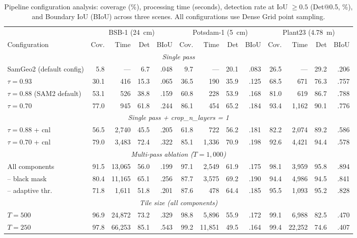 \documentclass[review,11pt,authoryear]{elsarticle}
\begin{document}
\begin{table}[htbp]
\centering
\caption{Pipeline configuration analysis: coverage (\%), processing time (seconds), detection rate at IoU $\geq 0.5$ (Det@0.5, \%), and Boundary IoU (BIoU) across three scenes. All configurations use Dense Grid point sampling.}
\label{tab:config}
\scriptsize
\begin{tabular}{l@{\hspace{6pt}}rrrr@{\hspace{8pt}}rrrr@{\hspace{8pt}}rrrr}
\toprule
 & \multicolumn{4}{c}{BSB-1 (24~cm)} & \multicolumn{4}{c}{Potsdam-1 (5~cm)} & \multicolumn{4}{c}{Plant23 (4.78~m)} \\
\cmidrule(lr){2-5} \cmidrule(lr){6-9} \cmidrule(lr){10-13}
Configuration & Cov. & Time & Det & BIoU & Cov. & Time & Det & BIoU & Cov. & Time & Det & BIoU \\
\midrule
\multicolumn{13}{c}{\footnotesize\textit{Single pass}} \\
\midrule
SamGeo2 (default config) & 5.8 & --- & 6.7 & .048 & 9.7 & --- & 20.1 & .083 & 26.5 & --- & 29.2 & .206 \\
$\tau = 0.93$ & 30.1 & 416 & 15.3 & .065 & 36.5 & 190 & 35.9 & .125 & 68.5 & 671 & 76.3 & .757 \\
$\tau = 0.88$ (SAM2 default) & 53.1 & 526 & 38.8 & .159 & 60.8 & 228 & 53.9 & .168 & 81.0 & 619 & 86.7 & .788 \\
$\tau = 0.70$ & 77.0 & 945 & 61.8 & .244 & 86.1 & 454 & 65.2 & .184 & 93.4 & 1{,}162 & 90.1 & .776 \\
\midrule
\multicolumn{13}{c}{\footnotesize\textit{Single pass + crop\_n\_layers = 1}} \\
\midrule
$\tau = 0.88$ + cnl & 56.5 & 2{,}740 & 45.5 & .205 & 61.8 & 722 & 56.2 & .181 & 82.2 & 2{,}074 & 89.2 & .586 \\
$\tau = 0.70$ + cnl & 79.0 & 3{,}483 & 72.4 & .322 & 85.1 & 1{,}336 & 70.9 & .198 & 92.6 & 4{,}421 & 94.4 & .578 \\
\midrule
\multicolumn{13}{c}{\footnotesize\textit{Multi-pass ablation ($T = 1{,}000$)}} \\
\midrule
All components & 91.5 & 13{,}065 & 56.0 & .199 & 97.1 & 2{,}549 & 61.9 & .175 & 98.1 & 3{,}959 & 95.8 & .894 \\
-- black mask & 80.4 & 11{,}165 & 65.1 & .256 & 87.7 & 3{,}575 & 69.2 & .190 & 94.4 & 4{,}986 & 94.5 & .841 \\
-- adaptive thr. & 71.8 & 1{,}611 & 51.8 & .201 & 87.6 & 478 & 64.4 & .185 & 95.5 & 1{,}093 & 95.2 & .828 \\
\midrule
\multicolumn{13}{c}{\footnotesize\textit{Tile size (all components)}} \\
\midrule
$T = 500$ & 96.9 & 24{,}872 & 73.2 & .329 & 98.8 & 5{,}896 & 55.9 & .172 & 99.1 & 6{,}988 & 82.5 & .470 \\
$T = 250$ & 97.8 & 66{,}253 & 85.1 & .543 & 99.2 & 11{,}851 & 49.5 & .164 & 99.4 & 22{,}252 & 74.6 & .407 \\
\bottomrule
\end{tabular}
\end{table}
\end{document}
